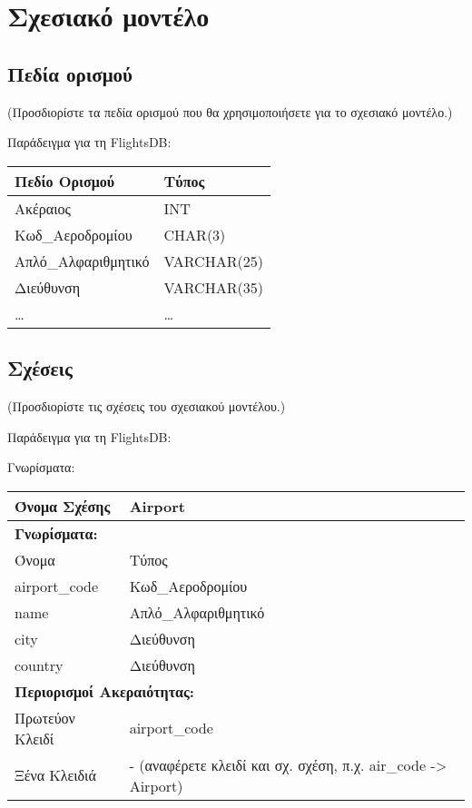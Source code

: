 
\section{Σχεσιακό μοντέλο}

\subsection{Πεδία ορισμού}

(Προσδιορίστε τα πεδία ορισμού που θα χρησιμοποιήσετε για το σχεσιακό
μοντέλο.)

Παράδειγμα για τη FlightsDB:

\begin{tabular}{|p{6cm}|p{6cm}|}
\hline
Πεδίο Ορισμού & Τύπος \\ \hline
Ακέραιος & INT \\ \hline
Κωδ\_Αεροδρομίου & CHAR(3) \\ \hline
Απλό\_Αλφαριθμητικό & VARCHAR(25) \\ \hline
Διεύθυνση & VARCHAR(35) \\ \hline
… & … \\ \hline
\end{tabular}

\subsection{Σχέσεις}

(Προσδιορίστε τις σχέσεις του σχεσιακού μοντέλου.)

Παράδειγμα για τη FlightsDB:

Γνωρίσματα:

\begin{tabular}{|p{6cm}|p{6cm}|}
  \hline
  Όνομα Σχέσης & Airport \\ \hline
  \multicolumn{2}{|l|}{\textbf{Γνωρίσματα:}} \\ \hline
  Όνομα & Τύπος \\ \hline
  airport\_code & Κωδ\_Αεροδρομίου \\ \hline
  name & Απλό\_Αλφαριθμητικό \\ \hline
  city & Διεύθυνση \\ \hline
  country & Διεύθυνση \\ \hline
  \multicolumn{2}{|l|}{\textbf{Περιορισμοί Ακεραιότητας:}} \\ \hline
  Πρωτεύον Κλειδί & airport\_code \\ \hline
  Ξένα Κλειδιά & - (αναφέρετε κλειδί και σχ. σχέση, π.χ. air\_code ->
                 Airport) \\ \hline
\end{tabular}

